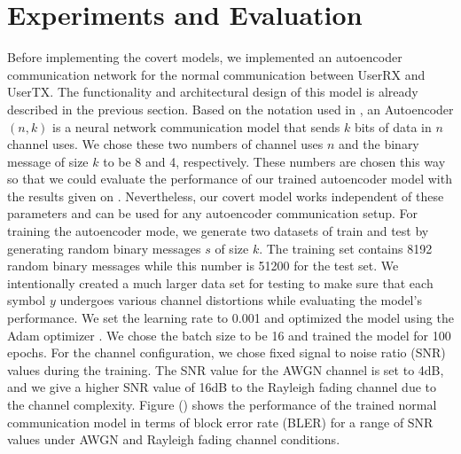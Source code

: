 \section{Experiments and Evaluation}
\label{s:eval}
Before implementing the covert models, we implemented an autoencoder communication network for the normal communication between UserRX and UserTX. The functionality and architectural design of this model is already described in the previous section. Based on the notation used in \cite{o2017introduction}, an Autoencoder \((n, k)\) is a neural network communication model that sends \(k\) bits of data in \(n\) channel uses. We chose these two numbers of channel uses \(n\) and the binary message of size \(k\) to be 8 and 4, respectively. These numbers are chosen this way so that we could evaluate the performance of our trained autoencoder model with the results given on \cite{o2017introduction}. Nevertheless, our covert model works independent of these parameters and can be used for any autoencoder communication setup. For training the autoencoder mode, we generate two datasets of train and test by generating random binary messages \(s\) of size \(k\). The training set contains 8192 random binary messages while this number is 51200 for the test set. We intentionally created a much larger data set for testing to make sure that each symbol \(y\) undergoes various channel distortions while evaluating the model's performance. We set the learning rate to 0.001 and optimized the model using the Adam optimizer \cite{kingma2014adam}. We chose the batch size to be 16 and trained the model for 100 epochs. For the channel configuration, we chose fixed signal to noise ratio (SNR) values during the training. The SNR value for the AWGN channel is set to 4dB, and we give a higher SNR value of 16dB to the Rayleigh fading channel due to the channel complexity. Figure () shows the performance of the trained normal communication model in terms of block error rate (BLER) for a range of SNR values under AWGN and Rayleigh fading channel conditions.\\
